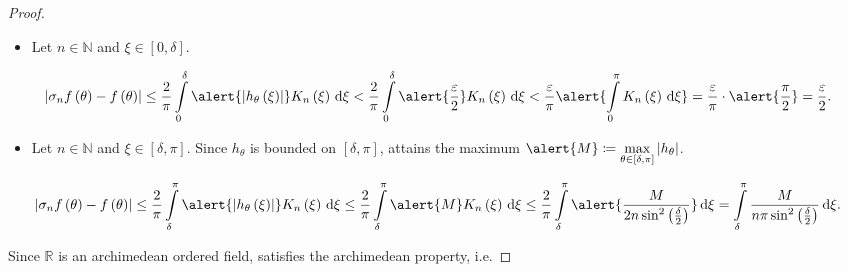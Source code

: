 \begin{frame}[allowframebreaks]
\begin{proof}
		\framebreak

		\begin{itemize}
			\item

			      Let $n\in\mathds{N}$ and $\xi\in\left[0,\delta\right]$.

		\end{itemize}

		\begin{equation*}
			\left|
			\sigma_{n}f\left(\theta\right)-
			f\left(\theta\right)
			\right|
			\leq
			\frac{2}{\pi}
			\int\limits_{0}^{\delta}
			\alert{
				\left|
				h_{\theta}\left(\xi\right)
				\right|
			}
			K_{n}\left(\xi\right)
			\dl\xi
			<
			\frac{2}{\pi}
			\int\limits_{0}^{\delta}
			\alert{
				\frac{\varepsilon}{2}
			}
			K_{n}\left(\xi\right)
			\dl\xi
			<
			\frac{\varepsilon}{\pi}
			\alert{
				\int\limits_{0}^{\pi}
				K_{n}\left(\xi\right)
				{\dl\xi}
			}
			=\frac{\varepsilon}{\pi}\cdot
			\alert{\frac{\pi}{2}}=
			\frac{\varepsilon}{2}.
		\end{equation*}

		\begin{itemize}
			\item

			      Let $n\in\mathds{N}$ and $\xi\in\left[\delta,\pi\right]$.
			      Since $h_{\theta}$ is bounded on
			      $\left[\delta,\pi\right]$, attains the maximum
			      \begin{math}
				      \alert{M}
				      \coloneqq
				      \max\limits_{\theta\in\left[\delta,\pi\right]}
				      \left|
				      h_{\theta}
				      \right|
			      \end{math}.
		\end{itemize}

		\begin{equation*}
			\left|
			\sigma_{n}f\left(\theta\right)-
			f\left(\theta\right)
			\right|
			\leq
			\frac{2}{\pi}
			\int\limits_{\delta}^{\pi}
			\alert{
				\left|
				h_{\theta}\left(\xi\right)
				\right|
			}
			K_{n}\left(\xi\right)
			\dl\xi
			\leq
			\frac{2}{\pi}
			\int\limits_{\delta}^{\pi}
			\alert{M}
			K_{n}\left(\xi\right)
			\dl\xi
			\leq
			\frac{2}{\pi}
			\int\limits_{\delta}^{\pi}
			\alert{
				\frac{M}{
					2n\sin^{2}\left(\frac{\delta}{2}\right)
				}
			}
			\dl\xi=
			\int\limits_{\delta}^{\pi}
			\frac{M}{n\pi\sin^{2}\left(\frac{\delta}{2}\right)}
			\dl\xi.
		\end{equation*}

		Since $\mathds{R}$ is an \alert{archimedean} ordered field,
		satisfies the \alert{archimedean property}, i.e.


\end{proof}
\end{frame}
